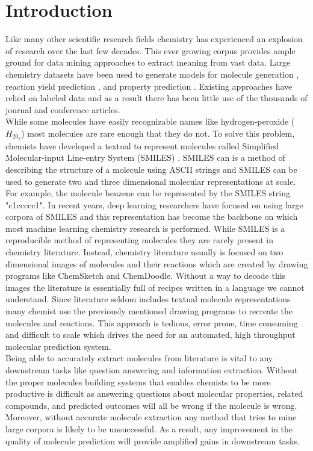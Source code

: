 \section{Introduction}
Like many other scientific research fields chemistry has experienced an explosion of research over the last few decades. This ever growing corpus provides ample ground for data mining approaches to extract meaning from vast data. Large chemistry datasets have been used to generate models for molecule generation \cite{}, reaction yield prediction \cite{}, and property prediction \cite{}. Existing approaches have relied on labeled data and as a result there has been little use of the thousands of journal and conference articles. \\
While some molecules have easily recognizable names like hydrogen-peroxide ($H_20_2$) most molecules are rare enough that they do not. To solve this problem, chemists have developed a textual to represent molecules called Simplified Molecular-input Line-entry System (SMILES) \cite{}. SMILES can is a method of describing the structure of a molecule using ASCII strings and SMILES can be used to generate two and three dimensional molecular representations at scale. For example, the molecule benzene can be represented by the SMILES string  "c1ccccc1". In recent years, deep learning researchers have focused on using large corpora of SMILES \cite{} and this representation has become the backbone on which most machine learning chemistry research is performed. While SMILES is a reproducible method of representing molecules they are rarely present in chemistry literature. Instead, chemistry literature usually is focused on two dimensional images of molecules and their reactions which are created by drawing programs like ChemSketch and ChemDoodle. Without a way to decode this images the literature is essentially full of recipes written in a language we cannot understand. Since literature seldom includes textual molecule representations many chemist use the previously mentioned drawing programs to recreate the molecules and reactions. This approach is tedious, error prone, time consuming and difficult to scale which drives the need for an automated, high throughput molecular prediction system. \\
Being able to accurately extract molecules from literature is vital to any downstream tasks like question answering and information extraction. Without the proper molecules building systems that enables chemists to be more productive is difficult as answering questions about molecular properties, related compounds, and predicted outcomes will all be wrong if the molecule is wrong. Moreover, without accurate molecule extraction any method that tries to mine large corpora is likely to be unsuccessful. As a result, any improvement in the quality of molecule prediction will provide amplified gains in downstream tasks. 
